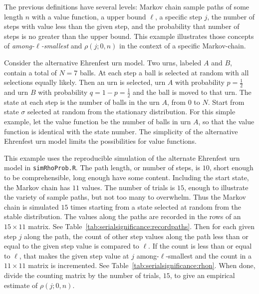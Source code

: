 \documentclass[12pt]{article}
\begin{document}
\begin{example}
The previous definitions have several levels:  Markov chain
sample paths of some
length \( n \) with a value function, a upper bound \( \ell \), a specific step \(j\), the
number of steps with value less than the given step, and the
probability that number of steps is no greater than the upper bound.
This example illustrates those  concepts of \emph{among-\( \ell
\)-smallest} and \( \rho(j; 0 ,n) \) in the context of a specific
Markov-chain. 

    Consider the alternative Ehrenfest urn
    model.%
    Two urns, labeled \( A \) and \( B \), contain a total of \( N = 7 \)
    balls.  At each step a ball is selected at random with all
    selections equally likely.  Then an urn is selected, urn \( A \)
    with probability \( p = \frac{1}{2} \) and urn \( B \) with
    probability \( q = 1-p = \frac {1}{2} \) and the ball is moved to
    that urn.  The state at each step is the number of balls in the urn \(
    A \), from \( 0 \) to \( N \).  Start from state \( \sigma \)
    selected at random from the stationary distribution.
    For this simple example, let the value function be the number of
    balls in urn \( A \), so that the value function is identical with
    the state number.  The simplicity of the alternative Ehrenfest urn
    model limits the possibilities for value functions.

    This example uses the reproducible simulation of the alternate
    Ehrenfest urn model in \texttt{simRhoProb.R}.
    The path length, or number of steps, is \(10 \), short enough to
    be comprehensible, long enough have some
    content. Including the start state, the Markov chain has \( 11 \)
    values.
    The number of trials is \( 15 \), enough to illustrate
    the variety of sample paths, but not too many to overwhelm.
    Thus the Markov chain is simulated \( 15 \) times starting from a state
    selected at random from the stable distribution.  The values along
    the paths are recorded in the rows of an \( 15 \times 11 \)
    matrix.  See Table~\ref{tab:serialsignificance:recordpaths}.
    Then for each given step \( j \) along the path, the count
    of other step values along the path less than or equal to the given step value is
    compared to \( \ell \).  If the count is less than or equal to \(
    \ell \), that makes the given step value at \( j \) among-\(\ell\)-smallest and the
    count in a \( 11 \times 11 \)  matrix is incremented.  See
    Table~\ref{tab:serialsignificance:rhon}.  When done, divide
    the counting matrix by the number of trials, \( 15 \), to
    give an empirical estimate of \( \rho(j; 0 ,n) \).


\end{example}
\end{document}
